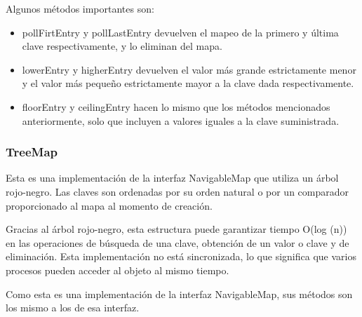 \documentclass[11pt]{article}
\begin{document}
Algunos métodos importantes son:

\begin{itemize}



\item pollFirtEntry y pollLastEntry devuelven el mapeo de la primero 
y última clave respectivamente, y lo eliminan del mapa.

\item lowerEntry y higherEntry devuelven el valor más grande 
estrictamente menor y el valor más pequeño estrictamente mayor a la 
clave dada respectivamente.

\item floorEntry y ceilingEntry hacen lo mismo que los métodos 
mencionados anteriormente, solo que incluyen a valores iguales a la 
clave suministrada.



\end{itemize}



\subsubsection{TreeMap}

\par

Esta es una implementación de la interfaz NavigableMap que utiliza un 
árbol rojo-negro. Las claves son ordenadas por su orden natural o por 
un comparador proporcionado al mapa al momento de creación.

\par

Gracias al árbol rojo-negro, esta estructura puede garantizar tiempo 
O(log (n)) en las operaciones de búsqueda de una clave, obtención de 
un valor o clave y de eliminación. Esta implementación no está 
sincronizada, lo que significa que varios procesos pueden acceder al 
objeto al mismo tiempo.

\par

Como esta es una implementación de la interfaz NavigableMap, sus 
métodos son los mismo a los de esa interfaz.
\end{document}
